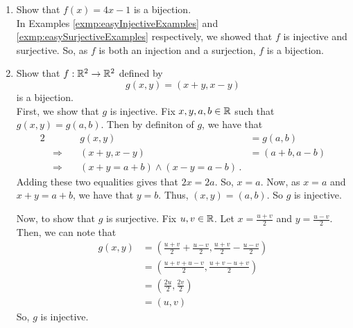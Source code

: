 \guard






\begin{exmp}
\label{exmp:easyBijectionExamples}
  \begin{enumerate}
    \item Show that $f(x) = 4x-1$ is a bijection.\\

    In Examples \ref{exmp:easyInjectiveExamples} and \ref{exmp:easySurjectiveExamples} respectively, we showed that $f$ is injective and surjective.
    So, as $f$ is both an injection and a surjection, $f$ is a bijection.

    \item Show that $f:\mathbb{R}^2\to\mathbb{R}^2$ defined by \[ g(x,y) = (x+y,x-y)\] is a bijection.\\

    First, we show that $g$ is injective.
    Fix $x,y,a,b\in\mathbb{R}$ such that $g(x,y) = g(a,b)$.
    Then by definiton of $g$, we have that
    \begin{alignat*}{2}
      && g(x,y)&=g(a,b) \\
      &\Rightarrow\quad& (x+y,x-y) &= (a+b,a-b) \\
      &\Rightarrow\quad& (x+y = a+b)\wedge (x-y=a-b)\,.
    \end{alignat*}
    Adding these two equalities gives that $ 2x = 2a$.
    So, $x=a$.
    Now, as $x=a$ and $x+y = a+b$, we have that $y=b$.
    Thus, $(x,y)=(a,b)$.
    So $g$ is injective.

    Now, to show that $g$ is surjective.
    Fix $u,v\in\mathbb{R}$.
    Let $x = \frac{u+v}{2}$ and $y=\frac{u-v}{2}$.
    Then, we can note that
    \begin{align*}
      g(x,y)  &= \left( \frac{u+v}{2}+\frac{u-v}{2}, \frac{u+v}{2}-\frac{u-v}{2} \right)\\
              &= \left( \frac{u+v+u-v}{2}, \frac{u+v-u+v}{2} \right)\\
              &= \left( \frac{2u}{2}, \frac{2v}{2} \right)\\
              &= \left( u, v \right)
    \end{align*}
    So, $g$ is injective.
  \end{enumerate}

\end{exmp}
